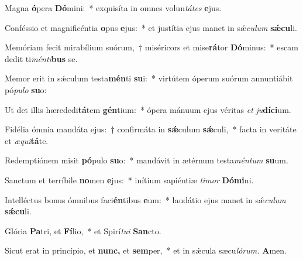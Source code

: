 \item Magna \textbf{ó}pera \textbf{Dó}mini:~* exquisíta in omnes volun\tinyhspace\textit{tá}\textit{tes} \textbf{e}jus.
\item Conféssio et magnificéntia \textbf{o}pus \textbf{e}jus:~* et justítia ejus manet in sǽ\tinyhspace\textit{culum} \textbf{sǽ}\textbf{cu}li.
\item Memóriam fecit mirabílium suórum,~† miséricors et mise\textbf{rá}tor \textbf{Dó}minus:~* escam dedit ti\textit{ménti}\textbf{bus} se.
\item Memor erit in sǽculum testa\textbf{mén}ti \textbf{su}i:~* virtútem óperum suórum annuntiábit pó\textit{pulo} \textbf{su}o:
\item Ut det illis hærededi\textbf{tá}tem \textbf{gén}tium:~* ópera mánuum ejus véritas \textit{et} \textit{ju}\textbf{díci}um.
\item Fidélia ómnia mandáta ejus:~† confirmáta in \textbf{sǽ}culum \textbf{sǽ}culi,~* facta in veritáte et \textit{æqui}\textbf{tá}te.
\item Redemptiónem misit \textbf{pó}pulo \textbf{su}o:~* mandávit in ætérnum testa\textit{méntum} \textbf{su}um.
\item Sanctum et terríbile \textbf{no}men \textbf{e}jus:~* inítium sapiéntiæ \textit{timor} \textbf{Dómi}ni.
\item Intelléctus bonus ómnibus faci\textbf{én}tibus \textbf{e}um:~* laudátio ejus manet in sǽ\textit{culum} \textbf{sǽcu}li.
\item Glória \textbf{Pa}tri, et \textbf{Fí}lio,~* et Spirí\tinyhspace\textit{tui} \textbf{San}cto.
\item Sicut erat in princípio, et \textbf{nunc,} et \textbf{sem}per,~* et in sǽcula sæcu\tinyhspace\textit{lórum.} \textbf{A}men.
